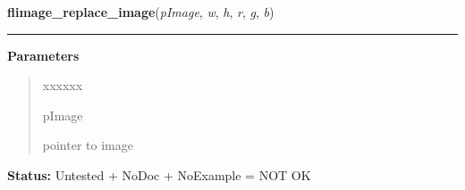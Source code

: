 \hspace{.8\funcindent}\begin{boxedminipage}{\funcwidth}

    \raggedright \textbf{flimage\_replace\_image}(\textit{pImage}, \textit{w}, \textit{h}, \textit{r}, \textit{g}, \textit{b})

    \vspace{-1.5ex}

    \rule{\textwidth}{0.5\fboxrule}
\setlength{\parskip}{2ex}
\setlength{\parskip}{1ex}
      \textbf{Parameters}
      \vspace{-1ex}

      \begin{quote}
        \begin{Ventry}{xxxxxx}

          \item[pImage]

          pointer to image

        \end{Ventry}

      \end{quote}

\textbf{Status:} Untested + NoDoc + NoExample = NOT OK



    \end{boxedminipage}

    \label{xformslib:library:flimage_swapbuffer}

    \vspace{0.5ex}

